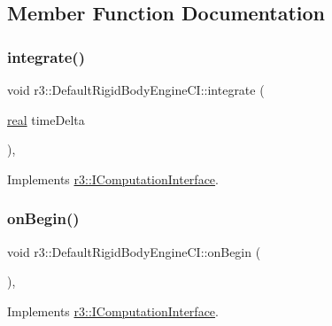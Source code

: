\subsection{Member Function Documentation}
\mbox{\label{classr3_1_1_default_rigid_body_engine_c_i_a4b79e7e4bc76eedcad7ef5c4777b9d33}} 
\subsubsection{\texorpdfstring{integrate()}{integrate()}}
{\footnotesize\ttfamily void r3\+::\+Default\+Rigid\+Body\+Engine\+C\+I\+::integrate (\begin{DoxyParamCaption}\item[{\mbox{\hyperlink{namespacer3_ab2016b3e3f743fb735afce242f0dc1eb}{real}}}]{time\+Delta }\end{DoxyParamCaption})\hspace{0.3cm}{\ttfamily [override]}, {\ttfamily [virtual]}}



Implements \mbox{\hyperlink{classr3_1_1_i_computation_interface_a162250f2b6efbd85460bd0f780d42cff}{r3\+::\+I\+Computation\+Interface}}.

\mbox{\label{classr3_1_1_default_rigid_body_engine_c_i_a5d9e40ea40845499f01081d21cd9ff64}} 
\subsubsection{\texorpdfstring{on\+Begin()}{onBegin()}}
{\footnotesize\ttfamily void r3\+::\+Default\+Rigid\+Body\+Engine\+C\+I\+::on\+Begin (\begin{DoxyParamCaption}{ }\end{DoxyParamCaption})\hspace{0.3cm}{\ttfamily [override]}, {\ttfamily [virtual]}}



Implements \mbox{\hyperlink{classr3_1_1_i_computation_interface_a430ebc9cb8d4ba064ac6a032ef07edd7}{r3\+::\+I\+Computation\+Interface}}.

